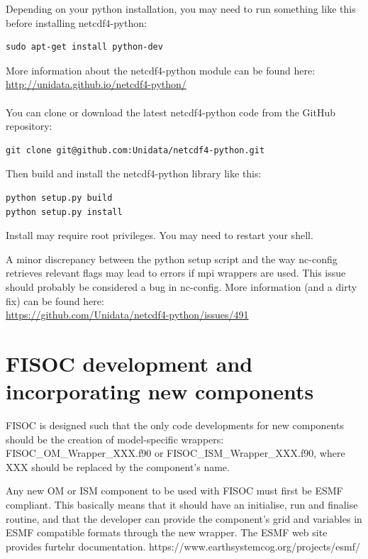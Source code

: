 \documentclass[12pt]{article}
\begin{document}
Depending on your python installation, you may need to run something like this
before installing netcdf4-python:
\begin{lstlisting}
sudo apt-get install python-dev
\end{lstlisting}
More information about the netcdf4-python module can be found here:\\
\url{http://unidata.github.io/netcdf4-python/}\\
\\
You can clone or download the latest netcdf4-python code from the GitHub 
repository:
\begin{lstlisting}
git clone git@github.com:Unidata/netcdf4-python.git 
\end{lstlisting}
Then build and install the netcdf4-python library like this:
\begin{lstlisting}
python setup.py build
python setup.py install
\end{lstlisting}
Install may require root privileges.
You may need to restart your shell.  

A minor discrepancy between the python setup script and the way nc-config 
retrieves relevant flags may lead to errors if mpi wrappers are used. 
This issue should probably be considered a bug in nc-config. 
More information (and a dirty fix) can be found here:\\
\url{https://github.com/Unidata/netcdf4-python/issues/491}\\






\section{FISOC development and incorporating new components}
\label{sec:FISOC_SDG}

FISOC is designed such that the only code developments for new components should be the creation 
of model-specific wrappers: FISOC\_OM\_Wrapper\_XXX.f90 or FISOC\_ISM\_Wrapper\_XXX.f90, where 
XXX should be replaced by the component's name.

Any new OM or ISM component to be used with FISOC must first be ESMF compliant.  This basically 
means that it should have an initialise, run and finalise routine, and that the developer can 
provide the component's grid and variables in ESMF compatible formats through the new wrapper.
The ESMF web site provides furtehr documentation.
https://www.earthsystemcog.org/projects/esmf/
\end{document}
